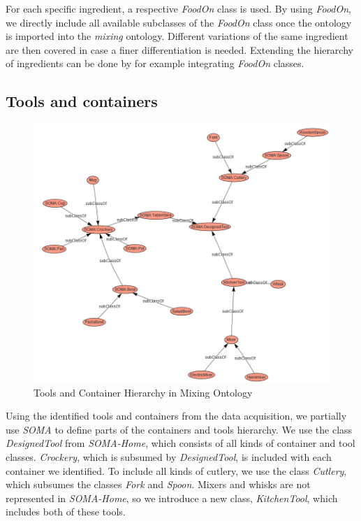 For each specific ingredient, a respective \textit{FoodOn}\cite{dooley2018foodon} class is used. By using \textit{FoodOn}, we directly include all available subclasses of the 
\textit{FoodOn} class once the ontology is imported into the \textit{mixing} ontology.
Different variations of the same ingredient are then covered in case a finer differentiation is needed. 
Extending the hierarchy of ingredients can be done by for example integrating \textit{FoodOn} classes.  

\subsection{Tools and containers}
\label{sec:toolsandcontainers}

\begin{figure}[H]
    \includegraphics[scale=0.45]{Graphics/classHierarchy/tools_hierarchy.png}
    \centering
    \caption{Tools and Container Hierarchy in Mixing Ontology}
\end{figure}

Using the identified tools and containers from the data acquisition, we partially use \textit{SOMA} to define parts of the containers and tools hierarchy.
We use the class \textit{DesignedTool} from \textit{SOMA-Home}, which consists of all kinds of container and tool classes. 
\textit{Crockery}, which is subsumed by \textit{DesignedTool}, is included with each container we identified. 
To include all kinds of cutlery, we use the class \textit{Cutlery}, which subsumes the classes \textit{Fork} and \textit{Spoon}. 
Mixers and whisks are not represented in \textit{SOMA-Home}, so we introduce a new class, \textit{KitchenTool}, which includes both of these tools.

